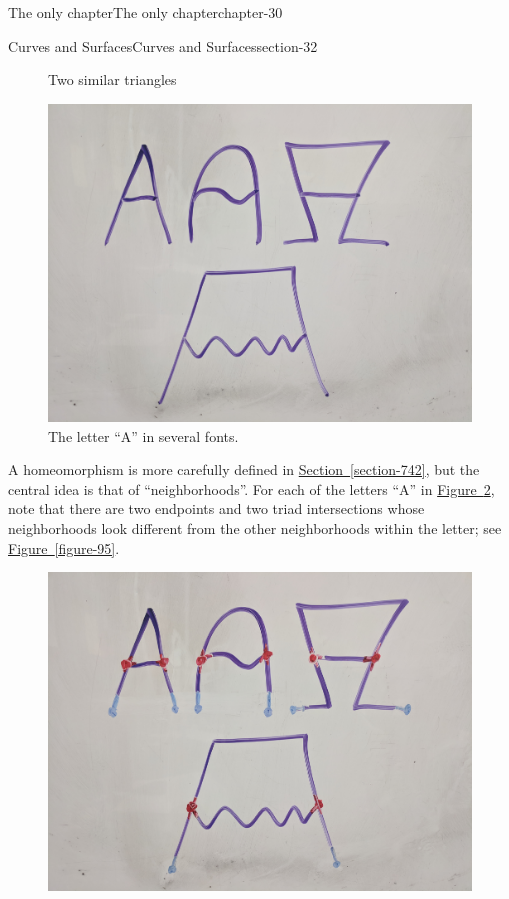 \documentclass[oneside,10pt,]{book}
\begin{document}
\begin{chapterptx}{The only chapter}{}{The only chapter}{}{}{chapter-30}
\begin{sectionptx}{Curves and Surfaces}{}{Curves and Surfaces}{}{}{section-32}
\begin{figure}
\caption{Two similar triangles\label{figure-82}}
\end{figure}
\begin{figure}
\centering
\includegraphics[width=1\linewidth]{images/letter-a.jpg}
\caption{The letter ``A'' in several fonts.\label{figure-85}}
\end{figure}
\hypertarget{p-89}{}%
A homeomorphism is more carefully defined in \hyperref[section-742]{Section~\ref{section-742}}, but the central idea is that of ``neighborhoods''. For each of the letters ``A'' in \hyperref[figure-85]{Figure~\ref{figure-85}}, note that there are two endpoints and two triad intersections whose neighborhoods look different from the other neighborhoods within the letter; see \hyperref[figure-95]{Figure~\ref{figure-95}}.%
\begin{figure}
\centering
\includegraphics[width=1\linewidth]{images/letter-a-neighborhoods.jpg}

\end{figure}
\end{sectionptx}
\end{chapterptx}
\end{document}
